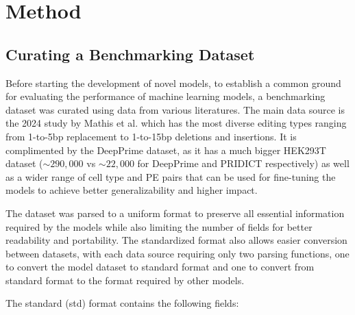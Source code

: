 \chapter{Method}

\minitoc

\section{Curating a Benchmarking Dataset}

\label{sec:datasets}

Before starting the development of novel models, to establish a common ground for evaluating the performance of machine learning models, a benchmarking dataset was curated using data from various literatures. The main data source is the 2024 study by Mathis et al. which has the most diverse editing types ranging from 1-to-5bp replacement to 1-to-15bp deletions and insertions\cite{mathisMachineLearningPrediction2024}. It is complimented by the DeepPrime dataset, as it has a much bigger HEK293T dataset ($\sim290,000$ vs $\sim22,000$ for DeepPrime and PRIDICT respectively) as well as a wider range of cell type and PE pairs that can be used for fine-tuning the models to achieve better generalizability and higher impact\cite{yuPredictionEfficienciesDiverse2023}. 

The dataset was parsed to a uniform format to preserve all essential information required by the models while also limiting the number of fields for better readability and portability. The standardized format also allows easier conversion between datasets, with each data source requiring only two parsing functions, one to convert the model dataset to standard format and one to convert from standard format to the format required by other models. 

The standard (std) format contains the following fields:

